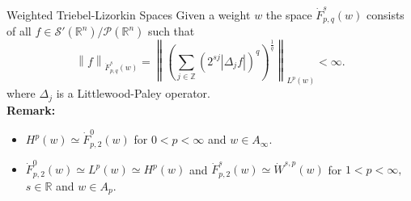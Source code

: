 \documentclass[xcolor=dvipsnames]{beamer}
\newcommand{\re}{\mathbb{R}}
\newcommand{\rn}{{{\mathbb R}^n}}
\newcommand{\ent}{\mathbb{Z}}
\newcommand{\abs}[1]{\vert #1 \vert}
\newcommand{\fr}[2]{{\textstyle \frac{#1}{#2}}}
\newcommand{\norm}[2]{{\left\| #1 \right\|}_{#2}}
\newcommand{\sw}{{\mathcal{S}}(\rn)}
\newcommand{\dx}{\, dx}
\newcommand{\swp}{{\mathcal{S}'}(\rn)}
\newcommand{\tlw}[4]{\dot F_{#1,#3}^{#2}(#4)} %
\newcommand{\lebw}[2]{L^{#1}(#2)} %
\begin{document}
\begin{frame}{Weighted Triebel-Lizorkin Spaces}
Given a weight $w$ the space $\tlw{p}{s}{q}{w}$ consists of all $f\in \swp/\mathcal{P}(\rn)$ such that 
\begin{equation*}
\norm{f}{\tlw{p}{s}{q}{w}}=\norm{\left(\sum_{j\in\ent}(2^{sj}|\Delta	_jf|)^q\right)^{\frac{1}{q}}}{\lebw{p}{w}}<\infty.
\end{equation*}
where $\Delta_j$ is a Littlewood-Paley operator.
\\
\bigskip
 {\bf Remark:} 
 \begin{itemize}
  \item $H^p(w)\simeq\tlw{p}{0}{2}{w}$  for $0<p<\infty$ and $w\in A_\infty.$ 
 \item $\tlw{p}{0}{2}{w}\simeq L^p(w)\simeq H^p(w)$ and $\tlw{p}{s}{2}{w}\simeq \dot{W}^{s,p}(w)$ for $1<p<\infty,$ $s\in\re$ and $w\in A_p.$  
\end{itemize}


\end{frame}


\end{document}

